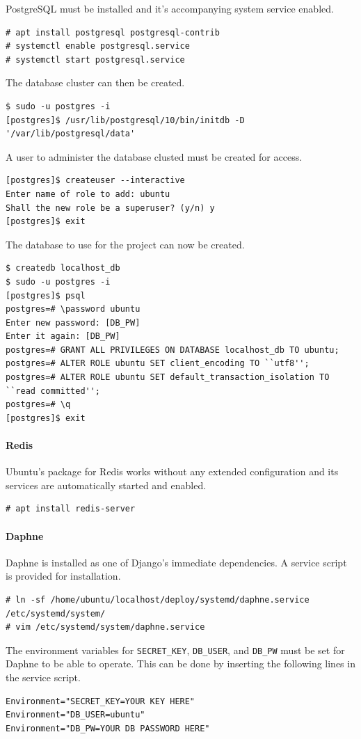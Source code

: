 PostgreSQL must be installed and it's accompanying system service enabled.
\begin{lstlisting}
# apt install postgresql postgresql-contrib
# systemctl enable postgresql.service
# systemctl start postgresql.service
\end{lstlisting}
The database cluster can then be created.
\begin{lstlisting}
$ sudo -u postgres -i
[postgres]$ /usr/lib/postgresql/10/bin/initdb -D '/var/lib/postgresql/data'
\end{lstlisting}
A user to administer the database clusted must be created for access.
\begin{lstlisting}
[postgres]$ createuser --interactive
Enter name of role to add: ubuntu
Shall the new role be a superuser? (y/n) y
[postgres]$ exit
\end{lstlisting}
The database to use for the project can now be created.
\begin{lstlisting}
$ createdb localhost_db
$ sudo -u postgres -i
[postgres]$ psql
postgres=# \password ubuntu
Enter new password: [DB_PW]
Enter it again: [DB_PW]
postgres=# GRANT ALL PRIVILEGES ON DATABASE localhost_db TO ubuntu;
postgres=# ALTER ROLE ubuntu SET client_encoding TO ``utf8'';
postgres=# ALTER ROLE ubuntu SET default_transaction_isolation TO ``read committed'';
postgres=# \q
[postgres]$ exit
\end{lstlisting}

\paragraph{Redis}

Ubuntu's package for Redis works without any extended configuration and its
services are automatically started and enabled.
\begin{lstlisting}
# apt install redis-server
\end{lstlisting}

\paragraph{Daphne}

Daphne is installed as one of Django's immediate dependencies.
A service script is provided for installation.
\begin{lstlisting}
# ln -sf /home/ubuntu/localhost/deploy/systemd/daphne.service /etc/systemd/system/
# vim /etc/systemd/system/daphne.service
\end{lstlisting}
The environment variables for \lstinline{SECRET_KEY}, \lstinline{DB_USER}, and
\lstinline{DB_PW} must be set for Daphne to be able to operate. This
can be done by inserting the following lines in the service script.
\begin{lstlisting}
Environment="SECRET_KEY=YOUR KEY HERE"
Environment="DB_USER=ubuntu"
Environment="DB_PW=YOUR DB PASSWORD HERE"
\end{lstlisting}

